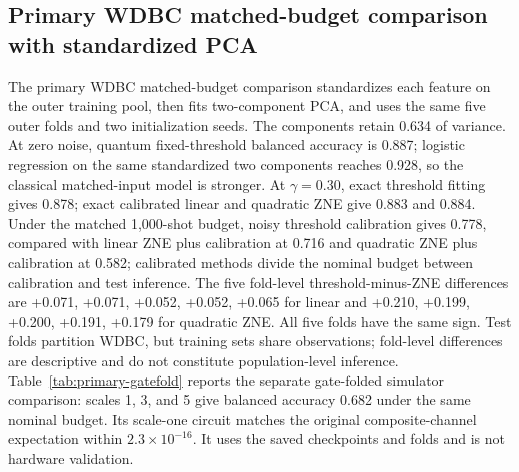 \documentclass[conference]{IEEEtran}
\begin{document}
\subsection{Primary WDBC matched-budget comparison with standardized PCA}
The primary WDBC matched-budget comparison standardizes each feature on the outer training pool, then fits two-component PCA, and uses the same five outer folds and two initialization seeds. The components retain 0.634 of variance. At zero noise, quantum fixed-threshold balanced accuracy is 0.887; logistic regression on the same standardized two components reaches 0.928, so the classical matched-input model is stronger. At $\gamma=0.30$, exact threshold fitting gives 0.878; exact calibrated linear and quadratic ZNE give 0.883 and 0.884. Under the matched 1,000-shot budget, noisy threshold calibration gives 0.778, compared with linear ZNE plus calibration at 0.716 and quadratic ZNE plus calibration at 0.582; calibrated methods divide the nominal budget between calibration and test inference. The five fold-level threshold-minus-ZNE differences are +0.071, +0.071, +0.052, +0.052, +0.065 for linear and +0.210, +0.199, +0.200, +0.191, +0.179 for quadratic ZNE. All five folds have the same sign. Test folds partition WDBC, but training sets share observations; fold-level differences are descriptive and do not constitute population-level inference.
Table~\ref{tab:primary-gatefold} reports the separate gate-folded simulator comparison: scales 1, 3, and 5 give balanced accuracy 0.682 under the same nominal budget. Its scale-one circuit matches the original composite-channel expectation within $2.3\times10^{-16}$. It uses the saved checkpoints and folds and is not hardware validation.
\end{document}
